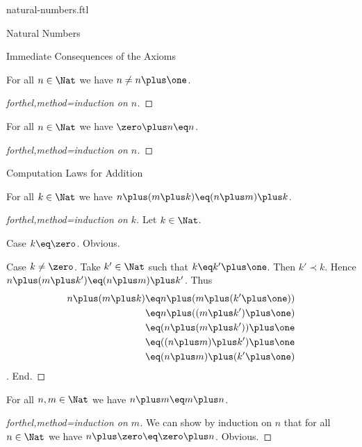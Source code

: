 \documentclass{naproche-library}
\begin{document}
\begin{smodule}{natural-numbers.ftl}
\begin{sfragment}{Natural Numbers}
  \begin{sfragment}{Immediate Consequences of the Axioms}
    \begin{proposition}[forthel,id=NatNumberIsNotItsOwnSuccessorProp]
      For all $n\in\Nat$ we have $n\neq n\plus\one$.
    \end{proposition}
    \begin{proof}[forthel,method=induction on $n$]\end{proof}

    \begin{proposition}[forthel,id=ZeroIsLeftIdentityOfPlusProp]
      For all $n\in\Nat$ we have $\zero\plus n\eq n$.
    \end{proposition}
    \begin{proof}[forthel,method=induction on $n$]\end{proof}
  \end{sfragment}

  \begin{sfragment}{Computation Laws for Addition}
    \begin{proposition}[forthel,title=Associativity,id=PlusIsAssociativeProp]
      For all $k\in\Nat$ we have $n\plus(m\plus k)\eq(n\plus m)\plus k$.
    \end{proposition}
    \begin{proof}[forthel,method=induction on $k$]
      Let $k\in\Nat$.

      Case $k\eq\zero$. Obvious.

      Case $k\neq\zero$.
        Take $k'\in\Nat$ such that $k\eq k'\plus\one$.
        Then $k'\prec k$.
        Hence $n\plus(m\plus k')\eq(n\plus m)\plus k'$.
        Thus
        \begin{align*}
          n\plus(m\plus k)
            &\eq n\plus(m\plus(k'\plus\one))\\
            &\eq n\plus((m\plus k')\plus\one)\\
            &\eq (n\plus(m\plus k'))\plus\one\\
            &\eq ((n\plus m)\plus k')\plus\one\\
            &\eq (n\plus m)\plus(k'\plus\one)
        \end{align*}.
      End.
    \end{proof}

    \begin{proposition}[forthel,title=Commutativity,id=PlusIsCommutativeProp]
      For all $n,m\in\Nat$ we have $n\plus m\eq m\plus n$.
    \end{proposition}
    \begin{proof}[forthel,method=induction on $m$]
      We can show by induction on $n$ that for all $n\in\Nat$ we have $n\plus\zero\eq\zero\plus n$.
      Obvious.


\end{proof}
\end{sfragment}
\end{sfragment}
\end{smodule}
\end{document}
